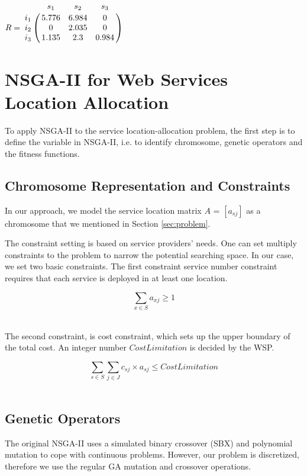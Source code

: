 \documentclass{llncs}
\let\bbordermatrix\bordermatrix
\begin{document}
{\centering
$
R = \bbordermatrix{~ & s_{1} & s_{2} & s_{3}\cr
					i_{1}	&5.776 &6.984 &0	\cr
					i_{2}	&0  &2.035 &0	\cr
					i_{3}	&1.135 &2.3 &0.984	\cr}
$
\\}


\section{NSGA-II for Web Services Location Allocation}
\label{sec:algorithm_des}
To apply NSGA-II to the service location-allocation problem, the first step is to define the variable in NSGA-II, i.e. to
identify chromosome, genetic operators and the fitness functions.

\subsection{Chromosome Representation and Constraints}
In our approach, we model the service location matrix $A$ = $[a_{sj}]$ as a chromosome that we mentioned in Section 
\ref{sec:problem}.

The constraint setting is based on service providers' needs. One can set multiply constraints to the problem to narrow the potential searching space.
In our case, we set two basic constraints. The first constraint service number constraint requires that each service is deployed in at 
least one location.

{\vspace*{0mm}
	\centering
	\begin{equation}
		\sum\limits_{x \in S} a_{xj} \geq 1
	\end{equation}
\\}

The second constraint, is cost constraint, which sets up  the upper boundary of the total cost.
An integer number $CostLimitation$ is decided by the WSP.

{\vspace*{0mm}
	\centering
	\begin{equation}
		\sum\limits_{s \in S} \sum\limits_{j \in J} c_{sj} \times a_{sj} \leq CostLimitation
	\end{equation}
\\}


\subsection{Genetic Operators}
\label{sec:operators}
 The original NSGA-II uses a simulated 
binary crossover (SBX) \cite{930314} and polynomial mutation \cite{Raghuwanshi04} 
to cope with continuous problems. 
However, our problem is discretized, therefore we use the regular GA mutation and crossover operations.
\end{document}
